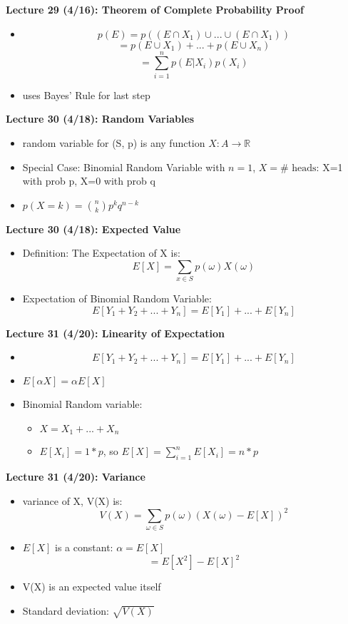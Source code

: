\documentclass[twocolumn]{article}
\begin{document}
\textbf{Lecture 29 (4/16): Theorem of Complete Probability Proof}
\begin{itemize}
    \item $$p(E) = p((E \cap X_1)\cup...\cup (E \cap X_1))$$
    $$= p(E\cup X_1)+...+p(E \cup X_n)$$
    $$= \sum_{i=1}^n p(E | X_i)p(X_i)$$
    \item uses Bayes' Rule for last step
\end{itemize}

\textbf{Lecture 30 (4/18): Random Variables}
\begin{itemize}
    \item random variable for (S, p) is any function $X: A \rightarrow \mathbb{R}$
    \item Special Case: Binomial Random Variable with $n=1$, $X=\# \text{ heads}$: X=1 with prob p, X=0 with prob q
    \item $p(X=k)={n \choose k}p^kq^{n-k}$
\end{itemize}

\textbf{Lecture 30 (4/18): Expected Value}
\begin{itemize}
    \item Definition: The Expectation of X is:
    $$E[X] = \sum_{x \in S}p(\omega)X(\omega)$$
    \item Expectation of Binomial Random Variable:
    $$E[Y_1+Y_2+...+Y_n]=E[Y_1]+...+E[Y_n]$$
\end{itemize}

\textbf{Lecture 31 (4/20): Linearity of Expectation}
\begin{itemize}
    \item 
    $$E[Y_1+Y_2+...+Y_n]=E[Y_1]+...+E[Y_n]$$
    \item 
    $E[\alpha X]=\alpha E[X]$
    \item Binomial Random variable:
    \begin{itemize}
        \item $X = X_1+...+X_n$
        \item $E[X_i] = 1 * p$, so $E[X] = \sum_{i=1}^n E[X_i]= n*p$
    \end{itemize}
\end{itemize}

\textbf{Lecture 31 (4/20): Variance}
\begin{itemize}
    \item variance of X, V(X) is:
    $$V(X)=\sum_{\omega \in S} p(\omega)(X(\omega)-E[X])^2$$
    \item $E[X]$ is a constant: $\alpha = E[X]$
    $$=E[X^2]-E[X]^2$$
    \item V(X) is an expected value itself
    \item Standard deviation: $\sqrt{V(X)}$
\end{itemize}
\end{document}
